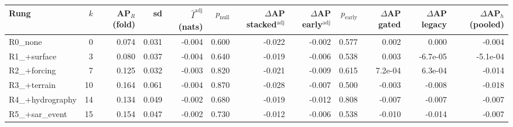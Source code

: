 \begin{tabular}{lrrrrrrrrrrr}
\toprule
Rung & $k$ & AP$_R$ (fold) & sd & $\hat I^{\mathrm{adj}}$ (nats) & $p_{\mathrm{null}}$ & $\Delta$AP stacked$^{\mathrm{adj}}$ & $\Delta$AP early$^{\mathrm{adj}}$ & $p_{\mathrm{early}}$ & $\Delta$AP gated & $\Delta$AP legacy & $\Delta$AP$_h$ (pooled) \\
\midrule
R0\_none & 0 & 0.074 & 0.031 & -0.004 & 0.600 & -0.022 & -0.002 & 0.577 & 0.002 & 0.000 & -0.004 \\
R1\_+surface & 3 & 0.080 & 0.037 & -0.004 & 0.640 & -0.019 & -0.006 & 0.538 & 0.003 & -6.7e-05 & -5.1e-04 \\
R2\_+forcing & 7 & 0.125 & 0.032 & -0.003 & 0.820 & -0.021 & -0.009 & 0.615 & 7.2e-04 & 6.3e-04 & -0.014 \\
R3\_+terrain & 10 & 0.164 & 0.061 & -0.004 & 0.870 & -0.028 & -0.007 & 0.500 & -0.003 & -0.008 & -0.018 \\
R4\_+hydrography & 14 & 0.134 & 0.049 & -0.002 & 0.680 & -0.019 & -0.012 & 0.808 & -0.007 & -0.007 & -0.007 \\
R5\_+sar\_event & 15 & 0.154 & 0.047 & -0.002 & 0.730 & -0.012 & -0.006 & 0.538 & -0.010 & -0.014 & -0.007 \\
\bottomrule
\end{tabular}
